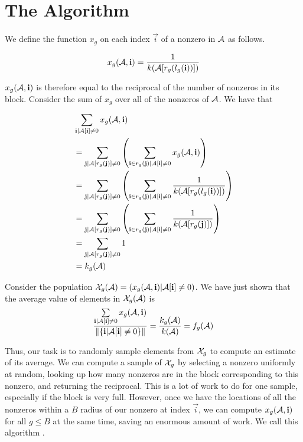 
  \section{The Algorithm}

    We define the function $x_g$ on each index $\vec{i}$ of a nonzero in $\mathbf{\mathcal{A}}$ as follows.

    \[
      x_g(\mathbf{\mathcal{A}}, \mathbf{i}) = \frac{1}{k(\mathbf{\mathcal{A}}[r_g(l_g(\mathbf{i}))])}
    \]

    $x_g(\mathbf{\mathcal{A}}, \mathbf{i})$ is therefore equal to the reciprocal of the number of nonzeros in its block. Consider the sum of $x_g$ over all of the nonzeros of $\mathbf{\mathcal{A}}$. We have that

    \begin{align*}
      &\sum\limits_{\mathbf{i} | \mathbf{\mathcal{A}}[\mathbf{i}] \neq 0} x_g(\mathbf{\mathcal{A}}, \mathbf{i})\\ &= \sum\limits_{\mathbf{j} | \mathbf{\mathcal{A}}[r_g(\mathbf{j})] \neq 0} \left(\sum\limits_{\mathbf{i} \in r_g(\mathbf{j}) | \mathbf{\mathcal{A}}[\mathbf{i}] \neq 0} x_g(\mathbf{\mathcal{A}}, \mathbf{i})\right)\\
      &= \sum\limits_{\mathbf{j} | \mathbf{\mathcal{A}}[r_g(\mathbf{j})] \neq 0} \left(\sum\limits_{\mathbf{i} \in r_g(\mathbf{j}) | \mathbf{\mathcal{A}}[\mathbf{i}] \neq 0} \frac{1}{k(\mathbf{\mathcal{A}}[r_g(l_g(\mathbf{i}))])}\right)\\
      &= \sum\limits_{\mathbf{j} | \mathbf{\mathcal{A}}[r_g(\mathbf{j})] \neq 0} \left(\sum\limits_{\mathbf{i} \in r_g(\mathbf{j}) | \mathbf{\mathcal{A}}[\mathbf{i}] \neq 0} \frac{1}{k(\mathbf{\mathcal{A}}[r_g(\mathbf{j})])}\right)\\
      &= \sum\limits_{\mathbf{j} | \mathbf{\mathcal{A}}[r_g(\mathbf{j})] \neq 0} 1\\
      &= k_g(\mathbf{\mathcal{A}})\\
    \end{align*}

    Consider the population $\mathcal{X}_g(\mathbf{\mathcal{A}}) = \left(x_g(\mathbf{\mathcal{A}}, \mathbf{i}) | \mathbf{\mathcal{A}}[\mathbf{i}] \neq 0\right)$. We have just shown that the average value of elements in $\mathcal{X}_g(\mathbf{\mathcal{A}})$ is
    \[
      \frac{\sum\limits_{\mathbf{i} | \mathbf{\mathcal{A}}[\mathbf{i}] \neq 0} x_g(\mathbf{\mathcal{A}}, \mathbf{i})}{\|\{\mathbf{i} | \mathbf{\mathcal{A}}[\mathbf{i}] \neq 0\}\|} = \frac{k_g(\mathbf{\mathcal{A}})}{k(\mathbf{\mathcal{A}})} = f_g(\mathbf{\mathcal{A}})
    \]

    Thus, our task is to randomly sample elements from $\mathcal{X}_g$ to compute an estimate of its average. We can compute a sample of $\mathcal{X}_g$ by selecting a nonzero uniformly at random, looking up how many nonzeros are in the block corresponding to this nonzero, and returning the reciprocal. This is a lot of work to do for one sample, especially if the block is very full. However, once we have the locations of all the nonzeros within a $B$ radius of our nonzero at index $\vec{i}$, we can compute $x_g(\mathbf{\mathcal{A}}, \mathbf{i})$ for all $g \leq B$ at the same time, saving an enormous amount of work. We call this algorithm .

